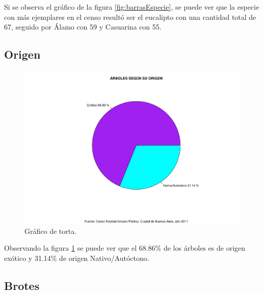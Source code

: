 \documentclass[11pt]{article}
\begin{document}
\begin{justify}
  Si se observa el gráfico de la figura \ref{fig:barrasEspecie},
  se puede ver que la especie con más ejemplares en el censo resultó
  ser el eucalipto con una cantidad total de 67, seguido por Álamo
  con 59 y Casuarina con 55.
\end{justify}


\newpage
\subsection{Origen}

\begin{figure}[h!]
  \begin{center}
    \includegraphics[width=\linewidth]{tortaOrigen.pdf}
    \caption{Gráfico de torta.}
    \label{fig:tortaOrigen}
  \end{center}  
\end{figure}

\begin{justify}
  Observando la figura \ref{fig:tortaOrigen} se puede ver que el 68.86\% de los
  árboles es de origen exótico y 31.14\% de origen Nativo/Autóctono.
\end{justify}


\newpage
\subsection{Brotes}
\end{document}
